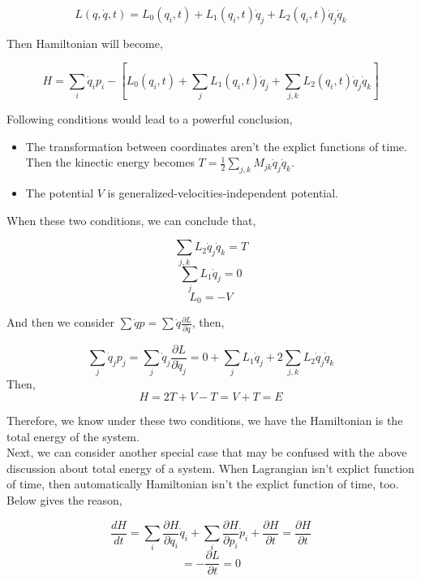 \documentclass[12pt]{article}
\begin{document}
\begin{center}
    \[ L(q, \dot{q}, t) = L_0(q_i, t) + L_1(q_i, t) \dot{q}_j + L_2(q_i, t)\dot{q}_j\dot{q}_k \]
\end{center}

Then Hamiltonian will become,

\begin{center}
    \[ H = \sum_i{\dot{q}_i p_i} - \left[ L_0(q_i, t) + \sum_{j}{L_1(q_i, t) \dot{q}_j} + \sum_{j,k}{L_2(q_i, t)\dot{q}_j\dot{q}_k}\right]\]
\end{center}

Following conditions would lead to a powerful conclusion,

\begin{itemize}
    \item The transformation between coordinates aren't the explict functions of time. Then the kinectic energy becomes $T = \frac{1}{2}\sum_{j, k}{M_{jk}\dot{q}_j\dot{q}_k}$.
    \item The potential $V$ is generalized-velocities-independent potential.
\end{itemize}

When these two conditions, we can conclude that,
\begin{center}
    \[ \sum_{j, k}{L_2\dot{q}_j\dot{q}_k} = T \]
    \[ \sum_{j}{L_1\dot{q}_j} = 0 \]
    \[ L_0 = -V \]
\end{center} 

And then we consider $\sum{\dot{q}p} = \sum{\dot{q}\frac{\partial L}{\partial \dot{q}}}$, then,

\begin{center}
    \[ \sum_{j}{\dot{q}_jp_j} = \sum_{j}{\dot{q}_j \frac{\partial L}{\partial \dot{q}_j}} = 0 + \sum_{j}{L_1\dot{q}_j} + 2 \sum_{j, k}{L_2 \dot{q}_j\dot{q}_k} \]
    Then,
    \[ H = 2T + V - T = V + T = E \]
\end{center}

Therefore, we know under these two conditions, we have the Hamiltonian is the total energy of the system.
\\
\indent Next, we can consider another special case that may be confused with the above discussion about total energy of a system. When Lagrangian isn't explict function of time, then automatically Hamiltonian isn't the explict function of time, too. Below gives the reason,

\begin{center}
    \[ \frac{dH}{dt} = \sum_{i}{\frac{\partial H}{\partial q_i}\dot{q}_i} + \sum_{i}{\frac{\partial H}{\partial p_i}\dot{p}_i} + \frac{\partial H}{\partial t} = \frac{\partial H}{\partial t} \]
    \[ = -\frac{\partial L}{\partial t} = 0 \]
\end{center}
\end{document}
